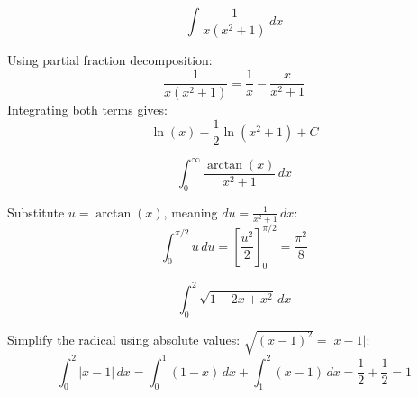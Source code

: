 \begin{questions}
\question
\[ \int \frac{1}{x(x^2+1)} \,dx \]
\begin{solution}
Using partial fraction decomposition:
\[ \frac{1}{x(x^2+1)} = \frac{1}{x} - \frac{x}{x^2+1} \]
Integrating both terms gives:
\[ \ln(x) - \frac{1}{2}\ln(x^2+1) + C \]
\end{solution}

\question
\[ \int_0^\infty \frac{\arctan(x)}{x^2+1} \,dx \]
\begin{solution}
Substitute $u = \arctan(x)$, meaning $du = \frac{1}{x^2+1} \,dx$:
\[ \int_0^{\pi/2} u \,du = \left[ \frac{u^2}{2} \right]_0^{\pi/2} = \frac{\pi^2}{8} \]
\end{solution}

\question
\[ \int_0^2 \sqrt{1-2x+x^2} \,dx \]
\begin{solution}
Simplify the radical using absolute values: $\sqrt{(x-1)^2} = |x-1|$:
\[ \int_0^2 |x-1| \,dx = \int_0^1 (1-x) \,dx + \int_1^2 (x-1) \,dx = \frac{1}{2} + \frac{1}{2} = 1 \]
\end{solution}

\end{questions}

